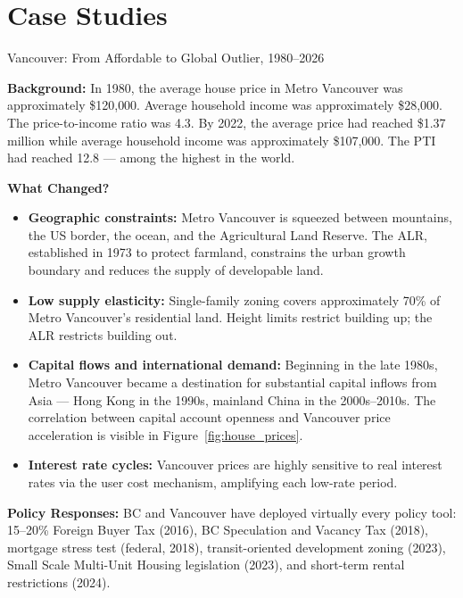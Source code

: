 \section{Case Studies}
\label{sec:ch3_casestudies}

\begin{casestudy}{Vancouver: From Affordable to Global Outlier, 1980--2026}

\textbf{Background:} In 1980, the average house price in Metro Vancouver
was approximately \$120{,}000. Average household income was approximately
\$28{,}000. The price-to-income ratio was 4.3. By 2022, the average price
had reached \$1.37 million while average household income was approximately
\$107{,}000. The PTI had reached 12.8 --- among the highest in the world.

\textbf{What Changed?}

\begin{itemize}
  \item \textbf{Geographic constraints:} Metro Vancouver is squeezed between
        mountains, the US border, the ocean, and the Agricultural Land Reserve.
        The ALR, established in 1973 to protect farmland, constrains the urban
        growth boundary and reduces the supply of developable land.

  \item \textbf{Low supply elasticity:} Single-family zoning covers
        approximately 70\% of Metro Vancouver's residential land. Height limits
        restrict building up; the ALR restricts building out.

  \item \textbf{Capital flows and international demand:} Beginning in the
        late 1980s, Metro Vancouver became a destination for substantial capital
        inflows from Asia --- Hong Kong in the 1990s, mainland China in the
        2000s--2010s. The correlation between capital account openness and
        Vancouver price acceleration is visible in Figure~\ref{fig:house_prices}.

  \item \textbf{Interest rate cycles:} Vancouver prices are highly sensitive
        to real interest rates via the user cost mechanism, amplifying each
        low-rate period.
\end{itemize}

\textbf{Policy Responses:} BC and Vancouver have deployed virtually every
policy tool: 15--20\% Foreign Buyer Tax (2016), BC Speculation and Vacancy
Tax (2018), mortgage stress test (federal, 2018), transit-oriented development
zoning (2023), Small Scale Multi-Unit Housing legislation (2023), and
short-term rental restrictions (2024).


\end{casestudy}
